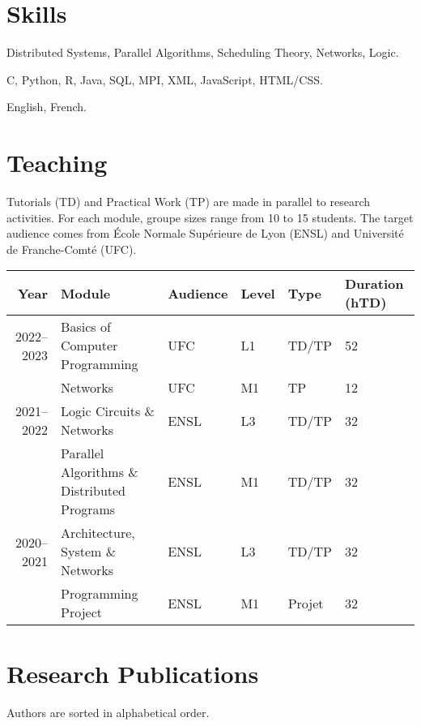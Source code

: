 \documentclass[12pt]{article}
\newcounter{cvitems}
\newcommand{\cvitem}[2]{\item[#1] #2}
\begin{document}
\section*{Skills}

\begin{cvitems}
  \cvitem{Academic}{Distributed Systems, Parallel Algorithms, Scheduling Theory, Networks, Logic.}

  \cvitem{Technical}{C, Python, R, Java, SQL, MPI, XML, JavaScript, HTML/CSS.}

  \cvitem{Language}{English, French.}
\end{cvitems}

\section*{Teaching}

Tutorials (TD) and Practical Work (TP) are made in parallel to research activities.  
For each module, groupe sizes range from 10 to 15 students.  
The target audience comes from École Normale Supérieure de Lyon (ENSL) and Université de
Franche-Comté (UFC).

\begin{center}
  \footnotesize
  \begin{tabularx}{\textwidth}{rXllll}
    \toprule
    Year & Module & Audience & Level & Type & Duration (hTD) \tabularnewline
    \midrule
    2022--2023 & Basics of Computer Programming & UFC & L1 & TD/TP & 52 \tabularnewline
    & Networks & UFC & M1 & TP & 12 \tabularnewline
    \midrule
    2021--2022 & Logic Circuits \& Networks & ENSL & L3 & TD/TP & 32 \tabularnewline
    & Parallel Algorithms \& Distributed Programs & ENSL & M1 & TD/TP & 32 \tabularnewline
    \midrule
    2020--2021 & Architecture, System \& Networks & ENSL & L3 & TD/TP & 32 \tabularnewline
    & Programming Project & ENSL & M1 & Projet & 32 \tabularnewline
    \bottomrule
  \end{tabularx}
\end{center}

\section*{Research Publications}

Authors are sorted in alphabetical order.

\nocite{*}

\newcommand{\showbib}[1]{%
  \begin{otherlanguage}{english}
    \printbibliography[heading=none,keyword={#1}]
  \end{otherlanguage}}
\end{document}
